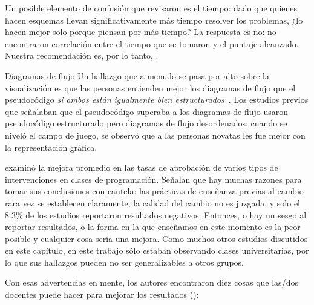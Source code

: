 Un posible elemento de confusión que revisaron es el tiempo:
dado que quienes hacen esquemas llevan significativamente más tiempo resolver los problemas,
¿lo hacen mejor solo porque piensan por más tiempo?
La respuesta es no:
no encontraron correlación entre el tiempo que se tomaron y el puntaje alcanzado.
Nuestra recomendación es, por lo tanto, .

\begin{aside}{Diagramas de flujo}
  Un hallazgo que a menudo se pasa por alto sobre la visualización es que
  las personas entienden mejor los diagramas de flujo que el pseudocódigo \emph{si ambos están igualmente bien estructurados}~\cite{Scan1989}.
  Los estudios previos que señalaban que el pseudocódigo superaba a los diagramas de flujo usaron pseudocódigo estructurado pero diagramas de flujo desordenados:
  cuando se niveló el campo de juego,
  se observó que a las personas novatas les fue mejor con la representación gráfica.
\end{aside}


\cite{Viha2014} examinó la mejora promedio en las tasas de aprobación de varios tipos de intervenciones en clases de programación.
Señalan que hay muchas razones para tomar sus conclusiones con cautela:
las prácticas de enseñanza previas al cambio rara vez se establecen claramente,
la calidad del cambio no es juzgada,
y solo el 8.3\% de los estudios reportaron resultados negativos. 
Entonces, o hay un sesgo al reportar resultados,
o la forma en la que enseñamos en este momento es la peor posible y cualquier cosa sería una mejora.
Como muchos otros estudios discutidos en este capítulo,
en este trabajo sólo estaban observando clases universitarias,
por lo que sus hallazgos pueden no ser generalizables a otros grupos.

Con esas advertencias en mente,
los autores encontraron diez cosas que las/dos docentes puede hacer para mejorar los resultados ():

